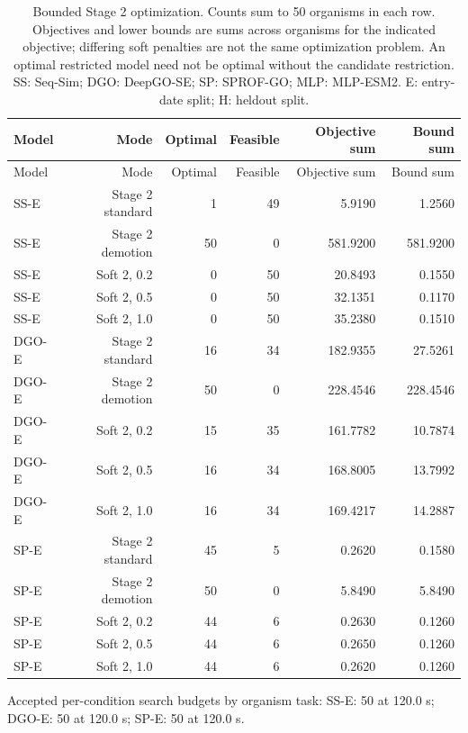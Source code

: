 \begingroup\scriptsize
\setlength{\tabcolsep}{4pt}
\begin{longtable}{lrrrrr}
\caption{Bounded Stage 2 optimization. Counts sum to 50 organisms in each row. Objectives and lower bounds are sums across organisms for the indicated objective; differing soft penalties are not the same optimization problem. An optimal restricted model need not be optimal without the candidate restriction. SS: Seq-Sim; DGO: DeepGO-SE; SP: SPROF-GO; MLP: MLP-ESM2. E: entry-date split; H: heldout split.}\label{tab:supp-solvers}\\
\toprule
Model & Mode & Optimal & Feasible & Objective sum & Bound sum \\
\midrule
\endfirsthead
\toprule
Model & Mode & Optimal & Feasible & Objective sum & Bound sum \\
\midrule
\endhead
SS-E & Stage 2 standard & 1 & 49 & 5.9190 & 1.2560 \\
SS-E & Stage 2 demotion & 50 & 0 & 581.9200 & 581.9200 \\
SS-E & Soft 2, 0.2 & 0 & 50 & 20.8493 & 0.1550 \\
SS-E & Soft 2, 0.5 & 0 & 50 & 32.1351 & 0.1170 \\
SS-E & Soft 2, 1.0 & 0 & 50 & 35.2380 & 0.1510 \\
DGO-E & Stage 2 standard & 16 & 34 & 182.9355 & 27.5261 \\
DGO-E & Stage 2 demotion & 50 & 0 & 228.4546 & 228.4546 \\
DGO-E & Soft 2, 0.2 & 15 & 35 & 161.7782 & 10.7874 \\
DGO-E & Soft 2, 0.5 & 16 & 34 & 168.8005 & 13.7992 \\
DGO-E & Soft 2, 1.0 & 16 & 34 & 169.4217 & 14.2887 \\
SP-E & Stage 2 standard & 45 & 5 & 0.2620 & 0.1580 \\
SP-E & Stage 2 demotion & 50 & 0 & 5.8490 & 5.8490 \\
SP-E & Soft 2, 0.2 & 44 & 6 & 0.2630 & 0.1260 \\
SP-E & Soft 2, 0.5 & 44 & 6 & 0.2650 & 0.1260 \\
SP-E & Soft 2, 1.0 & 44 & 6 & 0.2620 & 0.1260 \\
\bottomrule
\end{longtable}
\endgroup
\par Accepted per-condition search budgets by organism task: SS-E: 50 at 120.0 s; DGO-E: 50 at 120.0 s; SP-E: 50 at 120.0 s.
